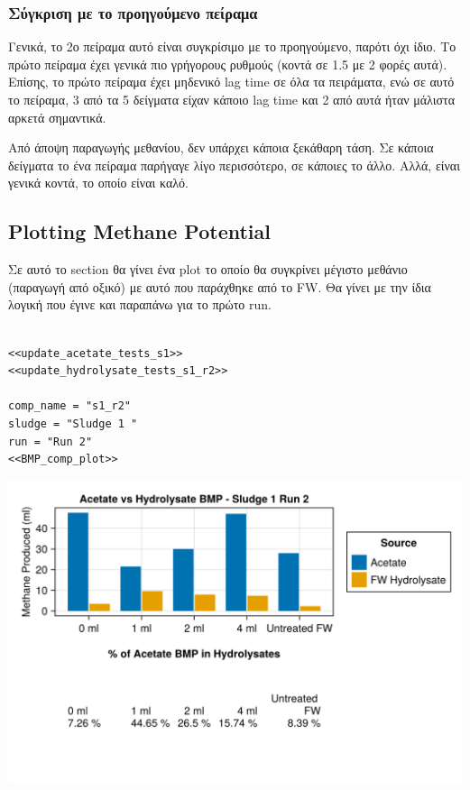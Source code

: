 \documentclass[11pt]{article}
\begin{document}
\subsubsection{Σύγκριση με το προηγούμενο πείραμα}
\label{sec:org29434e2}
Γενικά, το 2ο πείραμα αυτό είναι συγκρίσιμο με το προηγούμενο, παρότι όχι ίδιο. Το πρώτο πείραμα έχει γενικά πιο γρήγορους ρυθμούς (κοντά σε 1.5 με 2 φορές αυτά). Επίσης, το πρώτο πείραμα έχει μηδενικό lag time σε όλα τα πειράματα, ενώ σε αυτό το πείραμα, 3 από τα 5 δείγματα είχαν κάποιο lag time και 2 από αυτά ήταν μάλιστα αρκετά σημαντικά.

Από άποψη παραγωγής μεθανίου, δεν υπάρχει κάποια ξεκάθαρη τάση. Σε κάποια δείγματα το ένα πείραμα παρήγαγε λίγο περισσότερο, σε κάποιες το άλλο. Αλλά, είναι γενικά κοντά, το οποίο είναι καλό.

\subsection{Plotting Methane Potential}
\label{sec:orge251311}
Σε αυτό το section θα γίνει ένα plot το οποίο θα συγκρίνει μέγιστο μεθάνιο (παραγωγή από οξικό) με αυτό που παράχθηκε από το FW. Θα γίνει με την ίδια λογική που έγινε και παραπάνω για το πρώτο run.

\begin{verbatim}

<<update_acetate_tests_s1>>
<<update_hydrolysate_tests_s1_r2>>

comp_name = "s1_r2"
sludge = "Sludge 1 "
run = "Run 2"
<<BMP_comp_plot>>
\end{verbatim}

\begin{center}
\includegraphics[width=.9\linewidth]{../plots/BMPs/Hydrolyzed FW/acet_vs_hydro_bmp_s1_r2.png}
\end{center}
\end{document}
